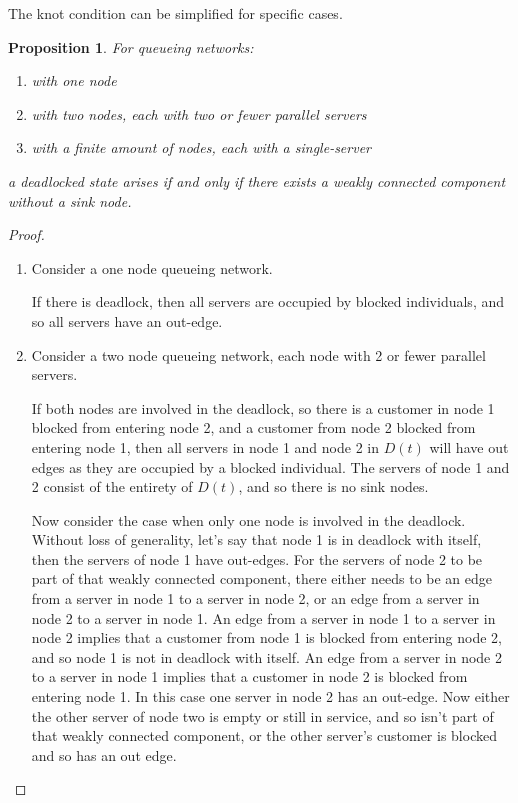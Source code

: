 \documentclass{article}
\newtheorem{proposition}{Proposition}
\begin{document}
The knot condition can be simplified for specific cases.\\

\begin{proposition}
For queueing networks:
\begin{enumerate}
  \item with one node
  \item with two nodes, each with two or fewer parallel servers
  \item with a finite amount of nodes, each with a single-server
\end{enumerate}
a deadlocked state arises if and only if there exists a weakly connected component without a sink node.
\end{proposition}

\begin{proof}

\begin{enumerate}

\item
Consider a one node queueing network.

If there is deadlock, then all servers are occupied by blocked individuals, and so all servers have an out-edge.

\item
Consider a two node queueing network, each node with 2 or fewer parallel servers.

If both nodes are involved in the deadlock, so there is a customer in node 1 blocked from entering node 2, and a customer from node 2 blocked from entering node 1, then all servers in node 1 and node 2 in $D(t)$ will have out edges as they are occupied by a blocked individual.
The servers of node 1 and 2 consist of the entirety of $D(t)$, and so there is no sink nodes.

Now consider the case when only one node is involved in the deadlock.
Without loss of generality, let's say that node 1 is in deadlock with itself, then the servers of node 1 have out-edges.
For the servers of node 2 to be part of that weakly connected component, there either needs to be an edge from a server in node 1 to a server in node 2, or an edge from a server in node 2 to a server in node 1.
An edge from a server in node 1 to a server in node 2 implies that a customer from node 1 is blocked from entering node 2, and so node 1 is not in deadlock with itself.
An edge from a server in node 2 to a server in node 1 implies that a customer in node 2 is blocked from entering node 1.
In this case one server in node 2 has an out-edge.
Now either the other server of node two is empty or still in service, and so isn't part of that weakly connected component, or the other server's customer is blocked and so has an out edge.


\end{enumerate}
\end{proof}
\end{document}
